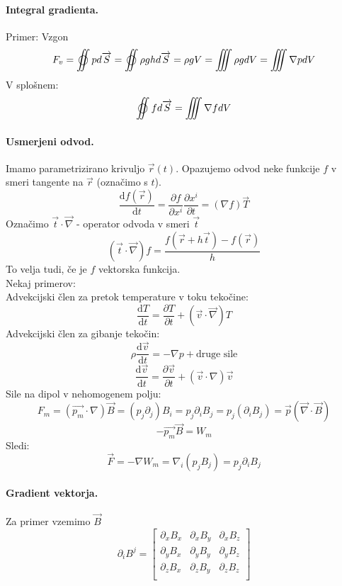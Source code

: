 \documentclass[a4paper]{article}
\newcommand{\vct}[1]{\overrightarrow{#1}}
\newcommand{\pd}[2]{\frac{\partial {#1}}{\partial {#2}}}
\newcommand{\dd}[2]{\frac{\mathrm{d} {#1}}{\mathrm{d} {#2}}}
\begin{document}
\paragraph{Integral gradienta.} Primer: Vzgon
$$F_{v} = \varoiint pd\vct{S} = \varoiint \rho g h d\vct{S} = \rho g V = \iiint \rho gdV = \iiint \nabla pdV$$
V splošnem:
$$\varoiint fd\vct{S} = \iiint \nabla f dV$$
\paragraph{Usmerjeni odvod.} Imamo parametrizirano krivuljo $\vct{r}(t)$. Opazujemo odvod neke funkcije $f$ v smeri tangente na $\vct{r}$ (označimo s $t$).
$$\dd{f(\vct{r})}{t} = \pd{f}{x^i}\pd{x^i}{t} = (\nabla f)\vct{T}$$
Označimo $\vct{t}\cdot\vct{\nabla}$ - operator odvoda v smeri $\vct{t}$
$$(\vct{t} \cdot \vct{\nabla})f = \frac{f(\vct{r} + h\vct{t}) - f(\vct{r})}{h}$$
To velja tudi, če je $f$ vektorska funkcija. \\[4mm]
Nekaj primerov: \\
Advekcijski člen za pretok temperature v toku tekočine:
$$\dd{T}{t} = \pd{T}{t} + (\vct{v}\cdot\vct{\nabla})T$$
Advekcijski člen za gibanje tekočin:
$$\rho \dd{\vct{v}}{t} = -\nabla p + \text{druge sile}$$
$$\dd{\vct{v}}{t} = \pd{\vct{v}}{t} + (\vct{v}\cdot\nabla)\vct{v}$$
Sile na dipol v nehomogenem polju:
$$F_m = (\vct{p_m}\cdot\nabla)\vct{B} = (p_j\partial_j)B_i = p_j\partial_iB_j = p_j(\partial_iB_j) = \vct{p}(\vct{\nabla}\cdot\vct{B})$$
$$-\vct{p_m}\vct{B} = W_m$$
Sledi:
$$\vct{F} = -\nabla W_m = \nabla_i(p_jB_j) = p_j\partial_iB_j$$
\paragraph{Gradient vektorja.} Za primer vzemimo $\vct{B}$
$$\partial_iB^j = \begin{bmatrix}
    \partial_xB_x & \partial_xB_y & \partial_xB_z \\
    \partial_yB_x & \partial_yB_y & \partial_yB_z \\
    \partial_zB_x & \partial_zB_y & \partial_zB_z \\
\end{bmatrix}$$
\end{document}

